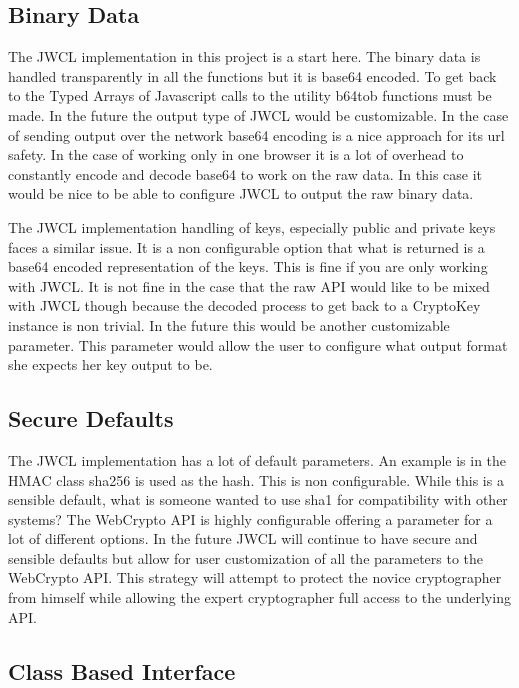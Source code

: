 \subsection{Binary Data}


The JWCL implementation in this project is a start here. The binary data is handled transparently in all the functions but it is base64 encoded. To get back to the Typed Arrays of Javascript calls to the utility b64tob functions must be made. In the future the output type of JWCL would be customizable. In the case of sending output over the network base64 encoding is a nice approach for its url safety. In the case of working only in one browser it is a lot of overhead to constantly encode and decode base64 to work on the raw data. In this case it would be nice to be able to configure JWCL to output the raw binary data.


The JWCL implementation handling of keys, especially public and private keys faces a similar issue. It is a non configurable option that what is returned is a base64 encoded representation of the keys. This is fine if you are only working with JWCL. It is not fine in the case that the raw API would like to be mixed with JWCL though because the decoded process to get back to a CryptoKey instance is non trivial. In the future this would be another customizable parameter. This parameter would allow the user to configure what output format she expects her key output to be. 


\subsection{Secure Defaults}


The JWCL implementation has a lot of default parameters. An example is in the HMAC class sha256 is used as the hash. This is non configurable. While this is a sensible default, what is someone wanted to use sha1 for compatibility with other systems? The WebCrypto API is highly configurable offering a parameter for a lot of different options. In the future JWCL will continue to have secure and sensible defaults but allow for user customization of all the parameters to the WebCrypto API. This strategy will attempt to protect the novice cryptographer from himself while allowing the expert cryptographer full access to the underlying API.


\subsection{Class Based Interface}


